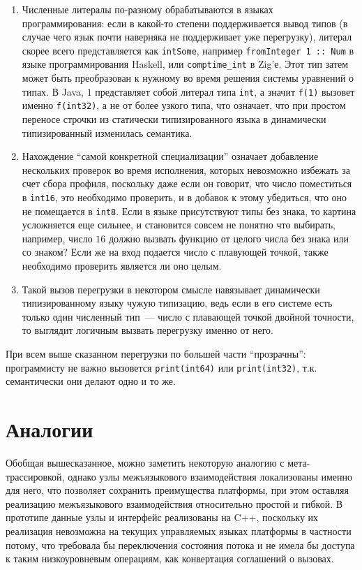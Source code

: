 \documentclass[times,specification,annotation]{itmo-student-thesis}
\begin{document}
\begin{enumerate}
	\item Численные литералы по-разному обрабатываются в языках программирования: если в какой-то степени поддерживается вывод типов (в случае чего язык почти наверняка не поддерживает уже перегрузку), литерал скорее всего представляется как \texttt{intSome}, например \texttt{fromInteger 1 :: Num} в языке программирования Haskell, или \texttt{comptime\_int} в Zig'е. Этот тип затем может быть преобразован к нужному во время решения системы уравнений о типах. В Java, $1$ представляет собой литерал типа \texttt{int}, а значит \texttt{f(1)} вызовет именно \texttt{f(int32)}, а не от более узкого типа, что означает, что при простом переносе строчки из статически типизированного языка в динамически типизированный изменилась семантика.
	\item Нахождение ``самой конкретной специализации'' означает добавление нескольких проверок во время исполнения, которых невозможно избежать за счет сбора профиля, поскольку даже если он говорит, что число поместиться в \texttt{int16}, это необходимо проверить, и в добавок к этому убедиться, что оно не помещается в \texttt{int8}. Если в языке присутствуют типы без знака, то картина усложняется еще сильнее, и становится совсем не понятно что выбирать, например, число $16$ должно вызвать функцию от целого числа без знака или со знаком? Если же на вход подается число с плавующей точкой, также необходимо проверить является ли оно целым.
	\item Такой вызов перегрузки в некотором смысле навязывает динамически типизированному языку чужую типизацию, ведь если в его системе есть только один численный тип~--- число с плавающей точкой двойной точности, то выглядит логичным вызвать перегрузку именно от него.
\end{enumerate}
При всем выше сказанном перегрузки по большей части ``прозрачны'': программисту не важно вызовется \texttt{print(int64)} или \texttt{print(int32)}, т.к. семантически они делают одно и то же.

\section{Аналогии}
Обобщая вышесказанное, можно заметить некоторую аналогию с мета-трассировкой, однако узлы межъязыкового взаимодействия локализованы именно для него, что позволяет сохранить преимущества платформы, при этом оставляя реализацию межъязыкового взаимодействия относительно простой и гибкой. В прототипе данные узлы и интерфейс реализованы на C++, поскольку их реализация невозможна на текущих управляемых языках платформы в частности потому, что требовала бы переключения состояния потока и не имела бы доступа к таким низкоуровневым операциям, как конвертация соглашений о вызовах.
\end{document}
